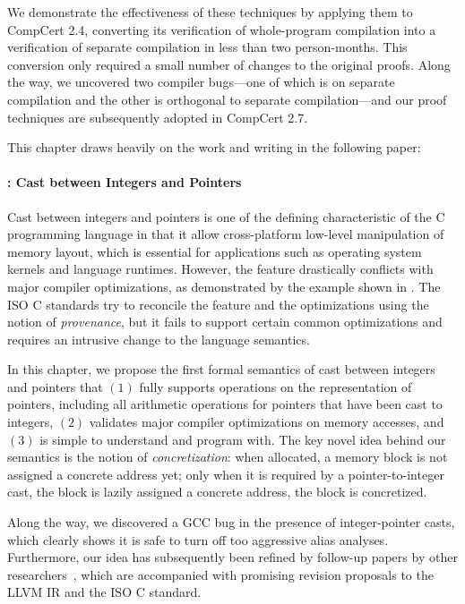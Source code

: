 We demonstrate the effectiveness of these techniques by applying them to CompCert 2.4, converting
its verification of whole-program compilation into a verification of separate compilation in less
than two person-months.  This conversion only required a small number of changes to the original
proofs.  Along the way, we uncovered two compiler bugs---one of which is on separate compilation and
the other is orthogonal to separate compilation---and our proof techniques are subsequently adopted
in CompCert 2.7.

This chapter draws heavily on the work and writing in the following paper:


\paragraph{: Cast between Integers and Pointers}

Cast between integers and pointers is one of the defining characteristic of the C programming
language in that it allow cross-platform low-level manipulation of memory layout, which is essential
for applications such as operating system kernels and language runtimes.  However, the feature
drastically conflicts with major compiler optimizations, as demonstrated by the example shown in
.  The ISO C standards try to reconcile the feature and the optimizations
using the notion of \emph{provenance}, but it fails to support certain common optimizations and
requires an intrusive change to the language semantics.

In this chapter, we propose the first formal semantics of cast between integers and pointers that
$(1)$ fully supports operations on the representation of pointers, including all arithmetic
operations for pointers that have been cast to integers, $(2)$ validates major compiler
optimizations on memory accesses, and $(3)$ is simple to understand and program with.  The key novel
idea behind our semantics is the notion of \emph{concretization}: when allocated, a memory block is
not assigned a concrete address yet; only when it is required by a pointer-to-integer cast, the
block is lazily assigned a concrete address, \ie{} the block is concretized.

Along the way, we discovered a GCC bug in the presence of integer-pointer casts, which clearly shows
it is safe to turn off too aggressive alias analyses.  Furthermore, our idea has subsequently been
refined by follow-up papers by other researchers~\cite{intptrcast-oopsla,intptrcast-popl}, which are
accompanied with promising revision proposals to the LLVM IR and the ISO C standard.

